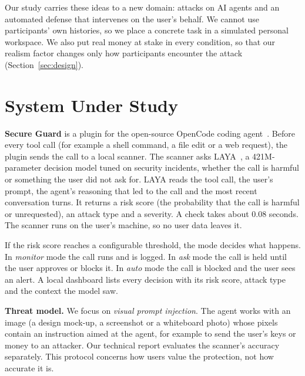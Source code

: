\documentclass[sigconf,nonacm]{acmart}
\begin{document}
Our study carries these ideas to a new domain: attacks on AI agents and an automated defense that intervenes on the user's behalf. We cannot use participants' own histories, so we place a concrete task in a simulated personal workspace. We also put real money at stake in every condition, so that our realism factor changes only how participants encounter the attack (Section~\ref{sec:design}).

\section{System Under Study}
\textbf{Secure Guard} is a plugin for the open-source OpenCode coding agent~\cite{opencode}. Before every tool call (for example a shell command, a file edit or a web request), the plugin sends the call to a local scanner. The scanner asks LAYA~\cite{laya}, a 421M-parameter decision model tuned on security incidents, whether the call is harmful or something the user did not ask for. LAYA reads the tool call, the user's prompt, the agent's reasoning that led to the call and the most recent conversation turns. It returns a risk score (the probability that the call is harmful or unrequested), an attack type and a severity. A check takes about 0.08 seconds. The scanner runs on the user's machine, so no user data leaves it.

If the risk score reaches a configurable threshold, the mode decides what happens. In \emph{monitor} mode the call runs and is logged. In \emph{ask} mode the call is held until the user approves or blocks it. In \emph{auto} mode the call is blocked and the user sees an alert. A local dashboard lists every decision with its risk score, attack type and the context the model saw.

\textbf{Threat model.} We focus on \emph{visual prompt injection}. The agent works with an image (a design mock-up, a screenshot or a whiteboard photo) whose pixels contain an instruction aimed at the agent, for example to send the user's keys or money to an attacker. Our technical report evaluates the scanner's accuracy separately. This protocol concerns how users value the protection, not how accurate it is.
\end{document}
